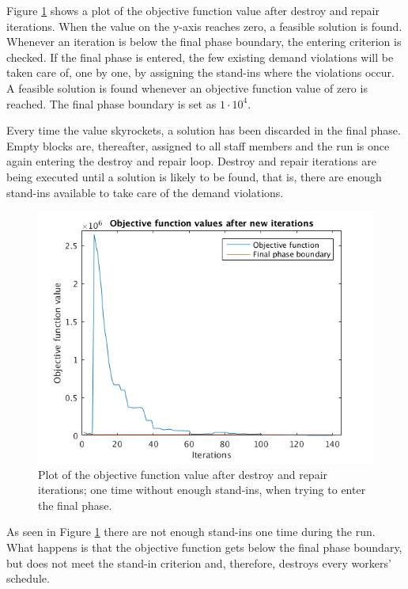 Figure \ref{fig:feasibleRerun} shows a plot of the objective function value after destroy and repair iterations. When the value on the y-axis reaches zero, a feasible solution is found. Whenever an iteration is below the final phase boundary, the entering criterion is checked. If the final phase is entered, the few existing demand violations will be taken care of, one by one, by assigning the stand-ins where the violations occur. A feasible solution is found whenever an objective function value of zero is reached. The final phase boundary is set as $1\cdot10^4$.

Every time the value skyrockets, a solution has been discarded in the final phase. Empty blocks are, thereafter, assigned to all staff members and the run is once again entering the destroy and repair loop. Destroy and repair iterations are being executed until a solution is likely to be found, that is, there are enough stand-ins available to take care of the demand violations. 

\begin{figure}[!h]
\centering
\includegraphics[scale = 0.8]{Chapters/ImagesClaes/1phase1iter1ReRun.png}
\caption{Plot of the objective function value after destroy and repair iterations; one time without enough stand-ins, when trying to enter the final phase.}
\label{fig:feasibleRerun}
\end{figure}

As seen in Figure \ref{fig:feasibleRerun} there are not enough stand-ins one time during the run. What happens is that the objective function gets below the final phase boundary, but does not meet the stand-in criterion and, therefore, destroys every workers' schedule. 

